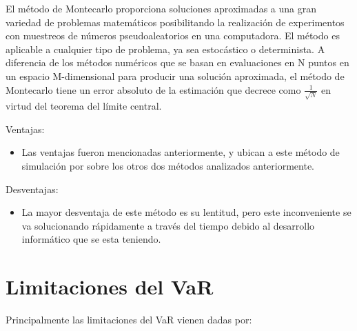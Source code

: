 \documentclass[
  12pt,
]{krantz}
\providecommand{\tightlist}{%
  \setlength{\itemsep}{0pt}\setlength{\parskip}{0pt}}
\begin{document}
El método de Montecarlo proporciona soluciones aproximadas a una gran variedad de problemas matemáticos posibilitando la realización de experimentos con muestreos de números pseudoaleatorios en una computadora. El método es aplicable a cualquier tipo de problema, ya sea estocástico o determinista. A diferencia de los métodos numéricos que se basan en evaluaciones en N puntos en un espacio M-dimensional para producir una solución aproximada, el método de Montecarlo tiene un error absoluto de la estimación que decrece como
\({\displaystyle {\frac {1}{\sqrt {N}}}}\) en virtud del teorema del límite central.

Ventajas:

\begin{itemize}
\tightlist
\item
  Las ventajas fueron mencionadas anteriormente, y ubican a este método de simulación por sobre los otros dos métodos analizados anteriormente.
\end{itemize}

Desventajas:

\begin{itemize}
\tightlist
\item
  La mayor desventaja de este método es su lentitud, pero este inconveniente se va solucionando rápidamente a través del tiempo debido al desarrollo informático que se esta teniendo.
\end{itemize}

\hypertarget{limitaciones-del-var}{%
\section{Limitaciones del VaR}\label{limitaciones-del-var}}

Principalmente las limitaciones del VaR vienen dadas por:
\end{document}
